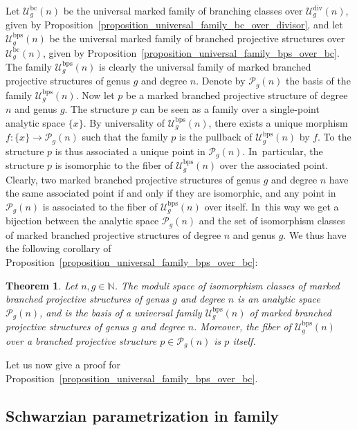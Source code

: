 \documentclass[JEP,XML,SOM,Unicode,NoEqCountersInSection,published]{cedram}
\newcommand{\N}{\mathbb N}
\newcommand{\BC}{\mathrm{bc}}
\newcommand{\BPS}{\mathrm{bps}}
\DeclareMathOperator{\Div}{div}
\theoremstyle{definition}
\theoremstyle{plain}
\newtheorem{theorem}[definition]{Theorem}
\begin{document}
Let $\mathcal U_g^{\BC}(n)$ be the universal marked family of branching classes over $\mathcal U_g^{\Div}(n)$, given by Proposition~\ref{proposition_universal_family_bc_over_divisor}, and let $\mathcal U_g^{\BPS}(n)$ be the universal marked family of branched projective structures over $\mathcal U_g^{\BC}(n)$, given by Proposition~\ref{proposition_universal_family_bps_over_bc}.
The family $\mathcal U_g^{\BPS}(n)$ is clearly the universal family of marked branched projective structures of genus $g$ and degree $n$.
Denote by $\mathcal P_g(n)$ the basis of the family $\mathcal U_g^{\BPS}(n)$.
Now let $p$ be a marked branched projective structure of degree $n$ and genus $g$.
The structure $p$ can be seen as a family over a single-point analytic space $\{x\}$.
By universality of $\mathcal U_g^{\BPS}(n)$, there exists a unique morphism $f: \{x\} \to \mathcal P_g(n)$ such that the family $p$ is the pullback of $\mathcal U_g^{\BPS}(n)$ by $f$.
To the structure $p$ is thus associated a unique point in $\mathcal P_g(n)$. In~particular, the structure $p$ is isomorphic to the fiber of $\mathcal U_g^{\BPS}(n)$ over the associated point.
Clearly, two marked branched projective structures of genus $g$ and degree $n$ have the same associated point if and only if they are isomorphic, and any point in $\mathcal P_g(n)$ is associated to the fiber of $\mathcal U_g^{\BPS}(n)$ over itself. In~this way we get a bijection between the analytic space $\mathcal P_g(n)$ and the set of isomorphism classes of marked branched projective structures of degree $n$ and genus $g$.
We thus have the following corollary of Proposition~\ref{proposition_universal_family_bps_over_bc}:

\begin{theorem}\label{theorem_moduli_space_bps}
Let $n, g \in \N$. The moduli space of isomorphism classes of marked branched projective structures of genus $g$ and degree $n$ is an analytic space $\mathcal P_g(n)$, and is the basis of a universal family $\mathcal U_g^{\BPS}(n)$ of marked branched projective structures of genus $g$ and degree $n$.
Moreover, the fiber of $\mathcal U_g^{\BPS}(n)$ over a branched projective structure $p \in \mathcal P_g(n)$ is $p$ itself.
\end{theorem}

Let us now give a proof for Proposition~\ref{proposition_universal_family_bps_over_bc}.

\subsection{Schwarzian parametrization in family}\label{subsection_Schwarzian_parametrization_in_family}
\end{document}
